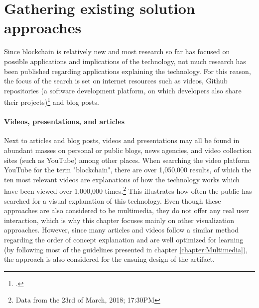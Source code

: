 \section{Gathering existing solution approaches} \label{sec:ExistingSolutions}

Since blockchain is relatively new and most research so far has focused on possible applications and implications of the technology, not much research has been published regarding applications explaining the technology. For this reason, the focus of the search is set on internet resources such as videos, Github repositories (a software development platform, on which developers also share their projects)\footcite[Cf.][]{GithubHowdevelopers} and blog posts. 

\paragraph{Videos, presentations, and articles} Next to articles and blog posts, videos and presentations may all be found in abundant masses on personal or public blogs, news agencies, and video collection sites (such as YouTube) among other places. When searching the video platform YouTube for the term "blockchain", there are over 1,050,000 results, of which the ten most relevant videos are explanations of how the technology works which have been viewed over 1,000,000 times.\footnote{Data from the 23rd of March, 2018; 17:30PM} This illustrates how often the public has searched for a visual explanation of this technology. Even though these approaches are also considered to be multimedia, they do not offer any real user interaction, which is why this chapter focuses mainly on other visualization approaches. However, since many articles and videos follow a similar method regarding the order of concept explanation and are well optimized for learning (by following most of the guidelines presented in chapter \ref{chapter:Multimedia}), the approach is also considered for the ensuing design of the artifact.

